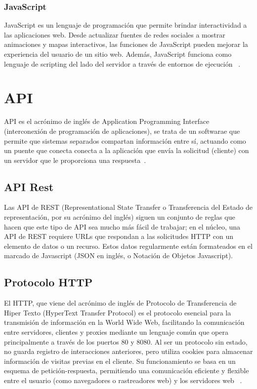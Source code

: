 \subsubsection{JavaScript}
JavaScript es un lenguaje de programación que permite brindar interactividad a las aplicaciones web. Desde actualizar fuentes de redes sociales a mostrar animaciones y mapas interactivos, las funciones de JavaScript pueden mejorar la experiencia del usuario de un sitio web. Además, JavaScript funciona como lenguaje de scripting del lado del servidor a través de entornos de ejecución ~\cite{JavascriptMDN}.

\section{API}
API es el acrónimo de inglés de Application Programming Interface (interconexión de programación de aplicaciones), se trata de un softwarae  que permite que sistemas separados compartan información entre sí, actuando como un puente que conecta conecta a la aplicación que envía la solicitud (cliente) con un servidor que le proporciona una respuesta~\cite{APIDazzet}. 

\subsection{API Rest}
Las API de REST (Representational State Transfer o Transferencia del Estado de representación, por su acrónimo del inglés) siguen un conjunto de reglas que hacen que este tipo de API sea mucho más fácil de trabajar; en el núcleo, una API de REST requiere URLs que respondan a las solicitudes HTTP con un elemento de datos o un recurso. Estos datos regularmente están formateados en el marcado de Javascript (JSON en inglés, o Notación de Objetos Javascript). 

\subsection{Protocolo HTTP}
El HTTP, que viene del acrónimo de inglés de Protocolo de Transferencia de Hiper Texto (HyperText Transfer Protocol) es el protocolo esencial para la transmisión de información en la World Wide Web, facilitando la comunicación entre servidores, clientes y proxies mediante un lenguaje común que opera principalmente a través de los puertos 80 y 8080. Al ser un protocolo sin estado, no guarda registro de interacciones anteriores, pero utiliza cookies para almacenar información de visitas previas en el cliente. Su funcionamiento se basa en un esquema de petición-respuesta, permitiendo una comunicación eficiente y flexible entre el usuario (como navegadores o rastreadores web) y los servidores web ~\cite{HTTPEditorialEtece}.


